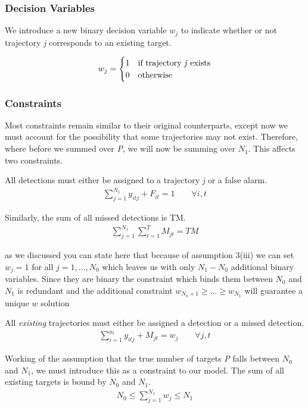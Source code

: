 \documentclass[journal]{IEEEtran}
\begin{document}
\subsubsection{Decision Variables}
We introduce a new binary decision variable $w_{j}$ to indicate whether or not trajectory \textit{j} corresponds to an existing target.

\[w_{j}= 
\begin{cases}
1 & \text{if trajectory \textit{j} exists}\\
0 & \text{otherwise}
\end{cases}\]


\subsubsection{Constraints}
Most constraints remain similar to their original counterparts, except now we must account for the possibility that some trajectories may not exist. Therefore, where before we summed over \textit{P}, we will now be summing over $N_{1}$. This affects two constraints.

All detections must either be assigned to a trajectory \textit{j} or a false alarm. 
\begin{align}
\sum_{j=1}^{N_{1}} y_{itj} + F_{it} = 1 \qquad \forall i,t
\end{align}

Similarly, the sum of all missed detections is TM. 
\begin{align}
\sum_{j=1}^{N_{1}} \sum_{t=1}^{T} M_{jt} = TM
\end{align}

{\color{red} as we discussed you can state here that because of assumption 3(iii) we can set $w_j=1$ for all $j=1,\ldots,N_0$ which leaves us with only $N_1-N_0$ additional binary variables. Since they are binary the constraint which binds them between $N_0$ and $N_1$ is redundant and the additional constraint $w_{N_0+1}\geq ...\geq w_{N_1}$ will guarantee a unique $w$ solution} 

All \textit{existing} trajectories must either be assigned a detection or a missed detection. 
\begin{align}
\sum_{i=1}^{n_{t}} y_{itj} + M_{jt} = w_{j} \qquad \forall j,t
\end{align}

Working of the assumption that the true number of targets \textit{P} falls between $N_{0}$ and $N_{1}$, we must introduce this as a constraint to our model. The sum of all existing targets is bound by $N_{0}$ and $N_{1}$.
\begin{align}
N_{0} \leq \sum_{j=1}^{N_{1}} w_{j} \leq N_{1}
\end{align}
\end{document}

